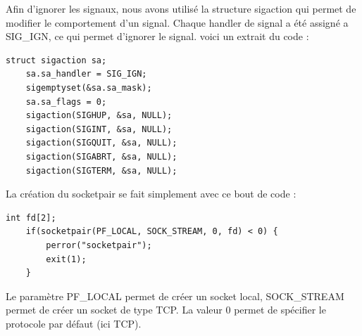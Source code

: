 \documentclass[
	a4paper, %
	10pt, %
]{CSUniSchoolLabReport}
\begin{document}
Afin d'ignorer les signaux, nous avons utilis\'e la structure sigaction qui permet de modifier le comportement d'un signal.
Chaque handler de signal a été assigné a SIG\_IGN, ce qui permet d'ignorer le signal.
voici un extrait du code :

\begin{lstlisting}[style=CStyle, firstnumber=1]
	struct sigaction sa;
	sa.sa_handler = SIG_IGN;
	sigemptyset(&sa.sa_mask);
	sa.sa_flags = 0;
	sigaction(SIGHUP, &sa, NULL);
	sigaction(SIGINT, &sa, NULL);
	sigaction(SIGQUIT, &sa, NULL);
	sigaction(SIGABRT, &sa, NULL);
	sigaction(SIGTERM, &sa, NULL);
\end{lstlisting}
La création du socketpair se fait simplement avec ce bout de code :
\begin{lstlisting}[style=CStyle, firstnumber=1]
	int fd[2];
    if(socketpair(PF_LOCAL, SOCK_STREAM, 0, fd) < 0) {
        perror("socketpair");
        exit(1);
    }
\end{lstlisting}
Le param\`etre PF\_LOCAL permet de créer un socket local, SOCK\_STREAM permet de créer un socket de type TCP. La valeur 0 permet de spécifier le protocole par défaut (ici TCP).
\end{document}

